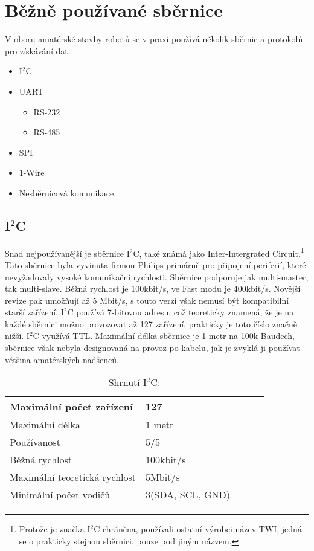 \chapter{Běžně používané sběrnice}
V oboru amatérské stavby robotů se v praxi používá několik sběrnic a protokolů pro získávání dat.
\begin{itemize}
	\item I$^{2}$C
	\item UART
	      \begin{itemize}
		      \item RS-232
		      \item RS-485
	      \end{itemize}
	\item SPI
	\item 1-Wire
	\item Nesběrnicová komunikace
\end{itemize}

\section{I$^{2}$C}
Snad nejpoužívanější je sběrnice I$^{2}$C,
také známá jako Inter-Intergrated Circuit.\footnote{ Protože je značka I$^{2}$C chráněna, používali ostatní výrobci název TWI, jedná se o prakticky stejnou sběrnici, pouze pod jiným názvem.}
Tato sběrnice byla vyvinuta firmou Philips primárně pro připojení periferií, které nevyžadovaly vysoké komunikační rychlosti.
Sběrnice podporuje jak multi-master, tak multi-slave.
Běžná rychlost je 100kbit/s, ve Fast modu je 400kbit/s. Novější revize pak umožňují až 5 Mbit/s, s touto verzí však nemusí být kompatibilní starší zařízení.
I$^{2}$C používá 7-bitovou adresu, což teoreticky znamená, že je na každé sběrnici možno provozovat až 127 zařízení, prakticky je toto číslo značně nižší.
I$^{2}$C využívá TTL.
Maximální délka sběrnice je 1 metr na 100k Baudech, sběrnice však nebyla designovaná na provoz po kabelu, jak je zvyklá ji používat většina amatérských nadšenců.\cite{nxp:UM10204}

\begin{table}[h]
	
	\centering
	\begin{tabular}{|l|l|l|l|l|} \hline
		Maximální počet zařízení      & 127              \\ \hline
		Maximální délka               & 1 metr           \\ \hline
		Používanost                   & 5/5              \\ \hline
		Běžná rychlost                & 100kbit/s        \\ \hline
		Maximální teoretická rychlost & 5Mbit/s          \\ \hline
		Minimální počet vodičů        & 3(SDA, SCL, GND) \\ \hline
	\end{tabular}
	\caption{Shrnutí I$^{2}$C:}
\end{table}



